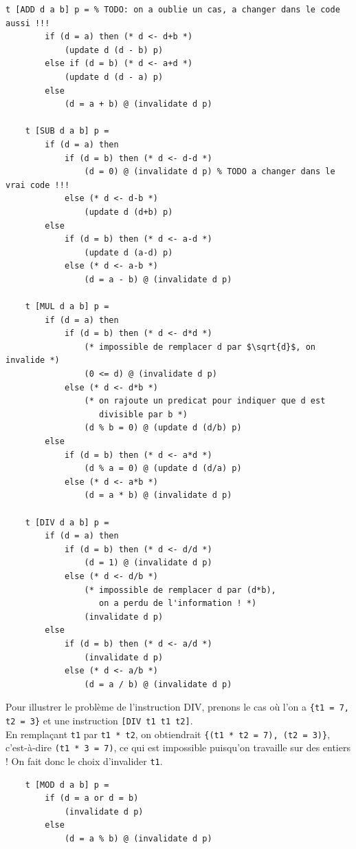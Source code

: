 \documentclass[french]{article}
\begin{document}
  \begin{lstlisting}[mathescape]
    t [ADD d a b] p = % TODO: on a oublie un cas, a changer dans le code aussi !!!
        if (d = a) then (* d <- d+b *)
            (update d (d - b) p)
        else if (d = b) (* d <- a+d *)
            (update d (d - a) p)
        else
            (d = a + b) @ (invalidate d p)

    t [SUB d a b] p =
        if (d = a) then
            if (d = b) then (* d <- d-d *)
                (d = 0) @ (invalidate d p) % TODO a changer dans le vrai code !!!
            else (* d <- d-b *)
                (update d (d+b) p)
        else
            if (d = b) then (* d <- a-d *)
                (update d (a-d) p)
            else (* d <- a-b *)
                (d = a - b) @ (invalidate d p)

    t [MUL d a b] p =
        if (d = a) then
            if (d = b) then (* d <- d*d *)
                (* impossible de remplacer d par $\sqrt{d}$, on invalide *)
                (0 <= d) @ (invalidate d p)
            else (* d <- d*b *)
                (* on rajoute un predicat pour indiquer que d est
                   divisible par b *)
                (d % b = 0) @ (update d (d/b) p)
        else
            if (d = b) then (* d <- a*d *)
                (d % a = 0) @ (update d (d/a) p)
            else (* d <- a*b *)
                (d = a * b) @ (invalidate d p)

    t [DIV d a b] p =
        if (d = a) then
            if (d = b) then (* d <- d/d *)
                (d = 1) @ (invalidate d p)
            else (* d <- d/b *)
                (* impossible de remplacer d par (d*b),
                   on a perdu de l'information ! *)
                (invalidate d p)
        else
            if (d = b) then (* d <- a/d *)
                (invalidate d p)
            else (* d <- a/b *)
                (d = a / b) @ (invalidate d p)
  \end{lstlisting}

  Pour illustrer le problème de l'instruction DIV, prenons le cas où l'on a \texttt{\{t1 = 7, t2 = 3\}} et une instruction \texttt{[DIV t1 t1 t2]}.\\
  En remplaçant \texttt{t1} par \texttt{t1 * t2}, on obtiendrait \texttt{\{(t1 * t2 = 7), (t2 = 3)\}}, c'est-à-dire \texttt{(t1 * 3 = 7)}, ce qui est impossible puisqu'on travaille sur des entiers ! On fait donc le choix d'invalider \texttt{t1}.

  \begin{lstlisting}
    t [MOD d a b] p =
        if (d = a or d = b)
            (invalidate d p)
        else
            (d = a % b) @ (invalidate d p)
  \end{lstlisting}
\end{document}
